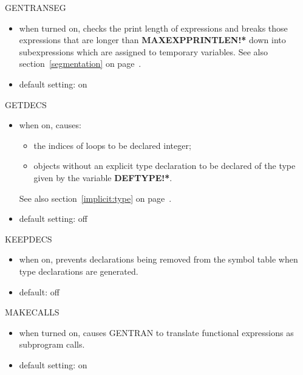 \begin{describe}{GENTRANSEG}
\begin{itemize}
\item when turned on, checks the print length of expressions and breaks
those expressions that are longer than {\bf MAXEXPPRINTLEN!*} down
into subexpressions which are assigned to temporary variables.
See also section~\ref{segmentation} on page~\pageref{segmentation}.
\item default setting:  on
\end{itemize}
\end{describe}

\begin{describe}{GETDECS}
\begin{itemize}
\item when on, causes:
\begin{itemize}
\item the indices of loops to be declared integer;
\item objects without an explicit type declaration to be declared of the type
given by the variable {\bf DEFTYPE!*}. 
\end{itemize}
See also section~\ref{implicit:type} on page~\pageref{implicit:type}.
\item default setting:  off
\end{itemize}
\end{describe}

\begin{describe}{KEEPDECS}
\begin{itemize}
\item when on, prevents declarations being removed from the symbol table when
type declarations are generated.
\item default: off
\end{itemize}
\end{describe}

\begin{describe}{MAKECALLS}
\begin{itemize}
\item when turned on, causes GENTRAN to translate functional expressions as
subprogram calls.
\item default setting: on
\end{itemize}
\end{describe}

